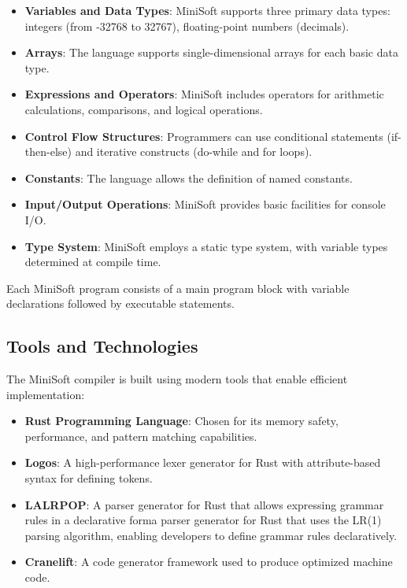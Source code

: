 \documentclass[12pt,a4paper]{article}
\begin{document}
\begin{itemize}
	\item \textbf{Variables and Data Types}: MiniSoft supports three primary data types: integers (from -32768 to 32767), floating-point numbers (decimals).

	\item \textbf{Arrays}: The language supports single-dimensional arrays for each basic data type.

	\item \textbf{Expressions and Operators}: MiniSoft includes operators for arithmetic calculations, comparisons, and logical operations.

	\item \textbf{Control Flow Structures}: Programmers can use conditional statements (if-then-else) and iterative constructs (do-while and for loops).

	\item \textbf{Constants}: The language allows the definition of named constants.

	\item \textbf{Input/Output Operations}: MiniSoft provides basic facilities for console I/O.

	\item \textbf{Type System}: MiniSoft employs a static type system, with variable types determined at compile time.
\end{itemize}

Each MiniSoft program consists of a main program block with variable declarations followed by executable statements.

\subsection{Tools and Technologies}
The MiniSoft compiler is built using modern tools that enable efficient implementation:

\begin{itemize}
	\item \textbf{Rust Programming Language}: Chosen for its memory safety, performance, and pattern matching capabilities.

	\item \textbf{Logos}: A high-performance lexer generator for Rust with attribute-based syntax for defining tokens.

	\item \textbf{LALRPOP}: A parser generator for Rust that allows expressing grammar rules in a declarative forma parser generator for Rust that uses the LR(1) parsing algorithm, enabling developers to define grammar rules declaratively.

	\item \textbf{Cranelift}: A code generator framework used to produce optimized machine code.
\end{itemize}
\end{document}
